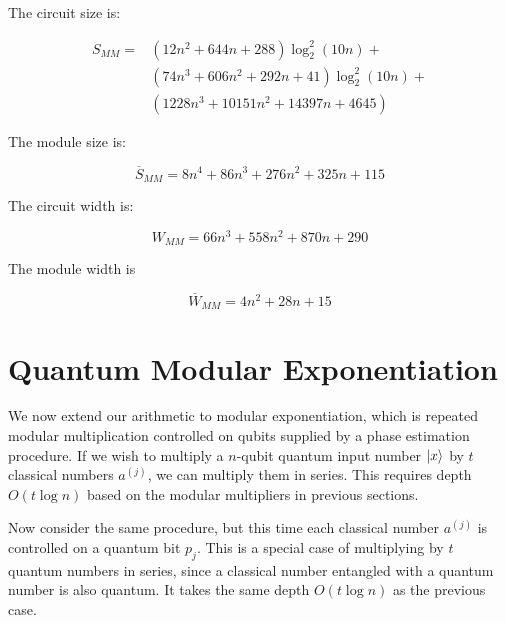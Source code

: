 \documentclass[twoside]{article}
\begin{document}
The circuit size is:

\begin{eqnarray}
S_{MM} = & (12n^2 + 644n + 288)\log_2^2 (10n) +\\
        & (74n^3 + 606n^2 + 292n + 41)\log_2^2 (10n) +\\
        & (1228n^3 + 10151n^2 + 14397n + 4645)
\end{eqnarray}

The module size is:

\begin{equation}
\overline{S}_{MM} = 8n^4 + 86n^3 + 276n^2 +325n + 115
\end{equation}

The circuit width is:

\begin{equation}
W_{MM} = 66n^3 + 558n^2 + 870n + 290
\end{equation}

The module width is

\begin{equation}
\overline{W}_{MM} = 4n^2 + 28n + 15
\end{equation}

%
\section{Quantum Modular Exponentiation}
\label{sec:modexp}

We now extend our arithmetic to modular exponentiation, which is repeated
modular multiplication controlled on qubits supplied by a phase estimation
procedure.
If we wish to multiply a $n$-qubit quantum input number $\left\vert{x}\right\rangle$ by
$t$ classical numbers $a^{(j)}$, we can multiply them in series.
This requires depth $O(t\log n)$ based on the modular multipliers in previous
sections.


Now consider the same procedure, but this time each classical number $a^{(j)}$
is controlled on a quantum bit $p_j$. This is a special case of
multiplying by $t$ quantum numbers in series, since a classical number
entangled with a quantum number is also quantum.
It takes the same depth $O(t\log n)$ as the previous case.
%
\end{document}
